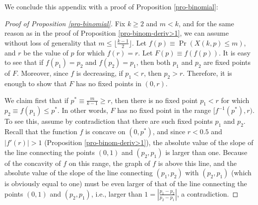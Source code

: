 \documentclass[12pt]{article}
\numberwithin{equation}{section}
\numberwithin{figure}{section}
\theoremstyle{definition}
\theoremstyle{plain}
\theoremstyle{plain}
\theoremstyle{plain}
\theoremstyle{remark}
\theoremstyle{plain}
\theoremstyle{plain}
\begin{document}
We conclude this appendix with a proof of Proposition  \ref{pro-binomial}:  \begin{proof}[Proof of Proposition \ref{pro-binomial}]
Fix $k\geq 2$ and $m<k$, and for the same reason as in the proof of Proposition \eqref{pro-binom-deriv>1}, we can assume without loss of generality that $m\leq \lfloor\frac{k-1}{2}\rfloor.$  Let $f(p)\equiv\Pr\left(X(k,p)\leq m\right)$, and $r$ be the value of $p$ for which $f(r)=r$. Let $F(p)\equiv f(f(p))$. It is easy to see that if $f(p_1)=p_2$ and $f(p_2)=p_1$, then both $p_1$ and $p_2$ are fixed points of $F$. Moreover, since $f$ is decreasing, if $p_1<r$, then $p_2>r$. Therefore, it is enough to show that $F$ has no fixed points in $(0,r)$.

We claim first that if $p^*\equiv\frac{m}{k-1}\geq r$, then there is no fixed point $p_1<r$ for which $p_2\equiv f(p_1)\leq p^*$. In other words, $F$ has no fixed point in the range $[f^{-1}(p^*),r)$. To see this, assume by contradiction that there are such  fixed points  $p_1$ and $p_2$. Recall that the function $f$ is concave on $(0,p^*)$, and since $r<0.5$ and $|f'(r)|>1$ (Proposition \eqref{pro-binom-deriv>1}), the absolute value of the slope of the line connecting the points $(0,1)$ and $(p_2,p_1)$ is larger than one. Because of the concavity of $f$ on this range, the graph of $f$ is above this line, and the absolute value of the slope of the line connecting $(p_1,p_2)$ with $(p_2,p_1)$ (which is obviously equal to one) must be even larger of that of the line 
connecting the points $(0,1)$ and $(p_2,p_1)$, i.e., larger than 
$1=\left|\frac{p_1-p_2}{p_2-p_1}\right|$, a contradiction.



\end{proof}
\end{document}
